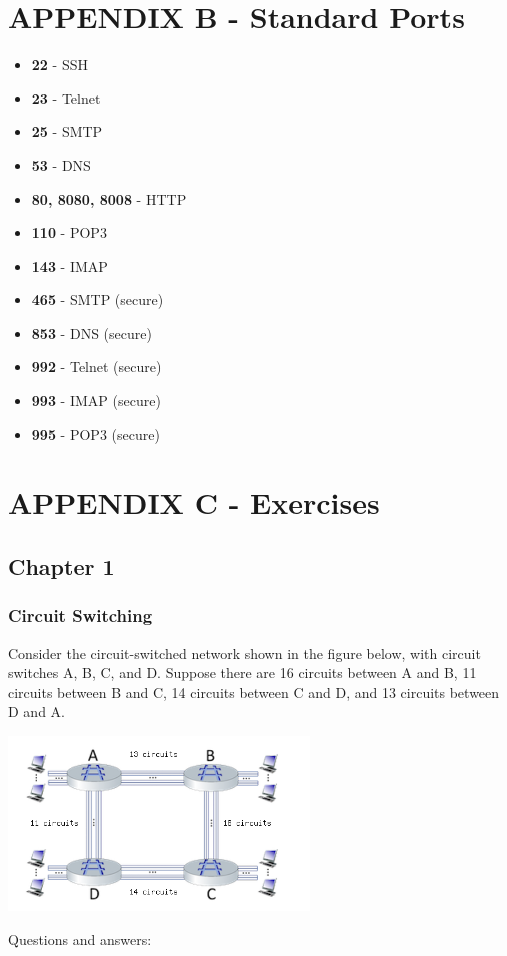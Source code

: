 \documentclass{article}
\begin{document}
\newpage

\section{APPENDIX B - Standard Ports}
\begin{itemize}
	\item \textbf{22} - SSH
	\item \textbf{23} - Telnet
	\item \textbf{25} - SMTP
	\item \textbf{53} - DNS
	\item \textbf{80, 8080, 8008} - HTTP
	\item \textbf{110} - POP3
	\item \textbf{143} - IMAP
    \item \textbf{465} - SMTP (secure)
    \item \textbf{853} - DNS (secure)
    \item \textbf{992} - Telnet (secure)
	\item \textbf{993} - IMAP (secure)
	\item \textbf{995} - POP3 (secure)
\end{itemize}

\newpage

\section{APPENDIX C - Exercises}

\subsection{Chapter 1}
\subsubsection{Circuit Switching}
Consider the circuit-switched network shown in the figure below, with circuit switches A, B, C, and D. Suppose there are 16 circuits between A and B, 11 circuits between B and C, 14 circuits between C and D, and 13 circuits between D and A. \\

 
\centerline{\includegraphics[width=8cm]{assets/ex1.png}}
\noindent Questions and answers:
\end{document}
